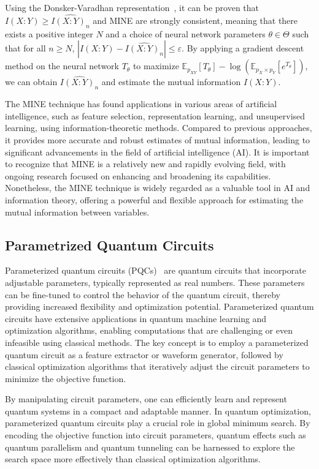 \documentclass[aps,groupedaddress,superscriptaddress,amssymb,amsmath,amsbsy,amsfonts,twocolumn,pra]{revtex4}
\begin{document}
Using the Donsker-Varadhan representation~\cite{DV76}, it can be proven that $I\left(X:Y\right) \geq \widehat{I\left(X:Y\right)_n}$ and MINE are strongly consistent, meaning that there exists a positive integer $N$ and a choice of neural network parameters $\theta \in \Theta$ such that for all $n \geq N$, $\left|I(X:Y) - \widehat{I(X:Y)_n}\right| \leq \varepsilon$. By applying a gradient descent method on the neural network $T_{\theta}$ to maximize $\mathbb{E}_{p_{XY}}[T_{\theta}]-\log\left(\mathbb{E}_{p_X \times p_Y}\left[e^{T_{\theta}}\right]\right)$, we can obtain $\widehat{I(X:Y)_n}$ and estimate the mutual information $I(X:Y)$.

The MINE technique has found applications in various areas of artificial intelligence, such as feature selection, representation learning, and unsupervised learning, using information-theoretic methods. Compared to previous approaches, it provides more accurate and robust estimates of mutual information, leading to significant advancements in the field of artificial intelligence (AI). It is important to recognize that MINE is a relatively new and rapidly evolving field, with ongoing research focused on enhancing and broadening its capabilities. Nonetheless, the MINE technique is widely regarded as a valuable tool in AI and information theory, offering a powerful and flexible approach for estimating the mutual information between variables.

\subsection{Parametrized Quantum Circuits}
Parameterized quantum circuits (PQCs)~\cite{BLSF19} are quantum circuits that incorporate adjustable parameters, typically represented as real numbers. These parameters can be fine-tuned to control the behavior of the quantum circuit, thereby providing increased flexibility and optimization potential. Parameterized quantum circuits have extensive applications in quantum machine learning and optimization algorithms, enabling computations that are challenging or even infeasible using classical methods. The key concept is to employ a parameterized quantum circuit as a feature extractor or waveform generator, followed by classical optimization algorithms that iteratively adjust the circuit parameters to minimize the objective function.

By manipulating circuit parameters, one can efficiently learn and represent quantum systems in a compact and adaptable manner. In quantum optimization, parameterized quantum circuits play a crucial role in global minimum search. By encoding the objective function into circuit parameters, quantum effects such as quantum parallelism and quantum tunneling can be harnessed to explore the search space more effectively than classical optimization algorithms.
\end{document}
